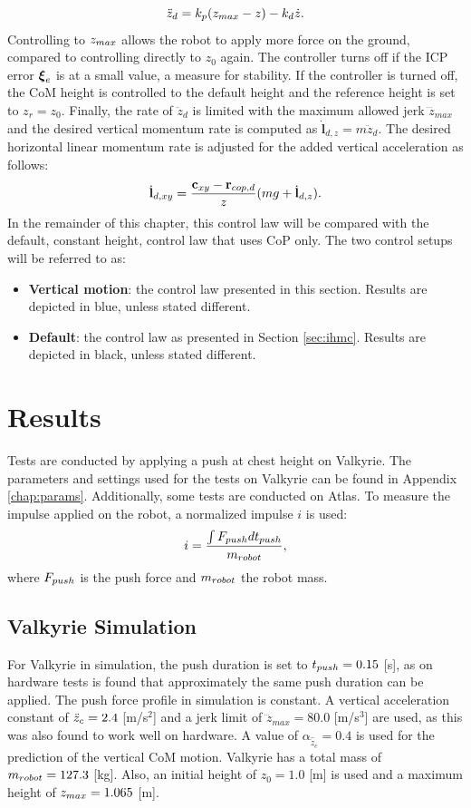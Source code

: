 \begin{equation}
	\ddot{z}_d = k_p(z_{max}-z)-k_d\dot{z}.
\end{equation}
Controlling to $z_{max}$ allows the robot to apply more force on the ground, compared to controlling directly to $z_0$ again. The controller turns off if the \ac{ICP} error $\boldsymbol{\xi}_e$ is at a small value, a measure for stability. If the controller is turned off, the \ac{CoM} height is controlled to the default height and the reference height is set to $z_r=z_0$. Finally, the rate of $\ddot{z}_d$ is limited with the maximum allowed jerk $\dddot{z}_{max}$ and the desired vertical momentum rate is computed as $\dot{\mathbf{l}}_{d,z}=m\ddot{z}_d$. The desired horizontal linear momentum rate is adjusted for the added vertical acceleration as follows:
\begin{equation}
    \dot{\mathbf{l}}_{d,xy}= \frac{\mathbf{c}_{xy}-\mathbf{r}_{cop,d}}{z}(mg+\dot{\mathbf{l}}_{d,z}).
\end{equation}
In the remainder of this chapter, this control law will be compared with the default, constant height, control law that uses \ac{CoP} only. The two control setups will be referred to as:
\begin{itemize}
\item \textbf{Vertical motion}: the control law presented in this section. Results are depicted in blue, unless stated different.
\item \textbf{Default}: the control law as presented in Section \ref{sec:ihmc}. Results are depicted in black, unless stated different.
\end{itemize}
\section{Results}
Tests are conducted by applying a push at chest height on Valkyrie. The parameters and settings used for the tests on Valkyrie can be found in Appendix \ref{chap:params}. Additionally, some tests are conducted on Atlas. To measure the impulse applied on the robot, a normalized impulse $i$ is used:
\begin{equation}
	i = \frac{\int F_{push} dt_{push}}{m_{robot}},
\end{equation}
where $F_{push}$ is the push force and $m_{robot}$ the robot mass.
\subsection{Valkyrie Simulation}
For Valkyrie in simulation, the push duration is set to $t_{push}=0.15$ [s], as on hardware tests is found that approximately the same push duration can be applied. The push force profile in simulation is constant. A vertical acceleration constant of $\ddot{z}_{c}=2.4$ [m/s$^2$] and a jerk limit of $\dddot{z}_{max}=80.0$ [m/s$^3$] are used, as this was also found to work well on hardware. A value of $\alpha_{\hat{\ddot{z}}_{c}}=0.4$ is used for the prediction of the vertical \ac{CoM} motion. Valkyrie has a total mass of $m_{robot}=127.3$ [kg]. Also, an initial height of $z_0=1.0$ [m] is used and a maximum height of $z_{max}=1.065$ [m]. 

